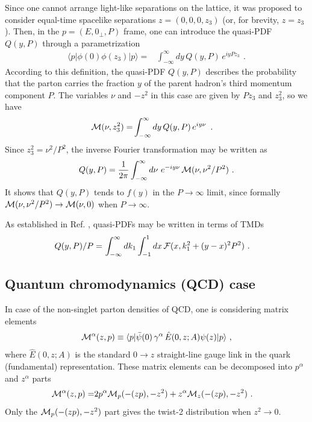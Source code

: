 Since one cannot arrange  light-like separations on the lattice,
it was proposed  \cite{Ji:2013dva}  to consider equal-time
spacelike separations
$z= (0,0,0,z_3)$ (or, for brevity, \mbox{$z=z_3$}). Then,
 in  the   \mbox{$p=(E, 0_\perp, P)$}  frame,
 one  can introduce the quasi-PDF  $Q(y, P)$    through a parametrization
  \begin{align}
  \langle p |   \phi(0) \phi (z_3)|p \rangle %
=  &
\int_{-\infty}^{\infty}   dy \,
 Q(y, P) \,  e^{i y  P z_3 } \,
 \  .
 \label{newVDFxzQ}
\end{align}
According to  this definition, the  quasi-PDF  $Q(y,P)$ describes  the probability
that  the  parton carries the  fraction $y$ of the parent hadron's third momentum
component $P$.
The variables $\nu$ and $-z^2$
 in this case are given by $Pz_3$ and $z_3^2$, so we have
 \begin{align}
{\cal M} (\nu,z_3^2)
=  &
\int_{-\infty}^{\infty}   dy \,
 Q(y, P) \,  e^{i y  \nu } \,
 \  .
\end{align}
Since $z_3^2= \nu^2/P^2$,   the inverse  Fourier transformation
may be written as
\begin{align}
  Q(y,  P)   =\frac{1}{2 \pi}  \int_{-\infty}^{\infty}  d\nu \,
   \, e^{-i y  \nu}  \, {\cal M} (\nu,  \nu^2/P^2)    \  .
\label{IxM}
\end{align}
It
shows that $  Q(y,  P)  $  tends to $f(y)$  in the
$P \to \infty$  limit,  since  formally    ${\cal M} (\nu,  \nu^2/P^2) \to {\cal M} (\nu, 0)$
when \mbox{$P \to \infty$. }

As established  in Ref.  \cite{Radyushkin:2016hsy}, quasi-PDFs may be written in terms of TMDs %
 \begin{align}
 Q(y, P) /P =  & \,\int_{-\infty}^{\infty} d  k_1
\int_{-1} ^ {1} d  x \,   {\cal F} (x, k_1^2+(y-x)^2P^2 )
  \  .
 \label{QTMD}
 \end{align}

\subsection{Quantum chromodynamics (QCD)  case}

In case of %
  the non-singlet parton densities of QCD,
one is considering matrix elements
    \begin{align}
 {\cal M}^\alpha  (z,p) \equiv \langle  p |  \bar \psi (0) \,
 \gamma^\alpha \,  { \hat E} (0,z; A) \psi (z) | p \rangle \  ,
\label{Malpha}
\end{align}
 where  $
{ \hat E}(0,z; A)$ is  the  standard  $0\to z$ straight-line gauge link
 in the quark (fundamental) representation.
 These matrix elements can  be decomposed into $p^\alpha$ and $z^\alpha$ parts
\begin{align}
{\cal M}^\alpha  (z,p) = &2 p^\alpha  {\cal M}_p (-(zp), -z^2)
 + z^\alpha  {\cal M}_z (-(zp),-z^2)
\ .
\end{align}
Only %
the ${\cal M}_p (-(zp), -z^2) $ part gives the twist-2 distribution when  $z^2 \to 0$.

